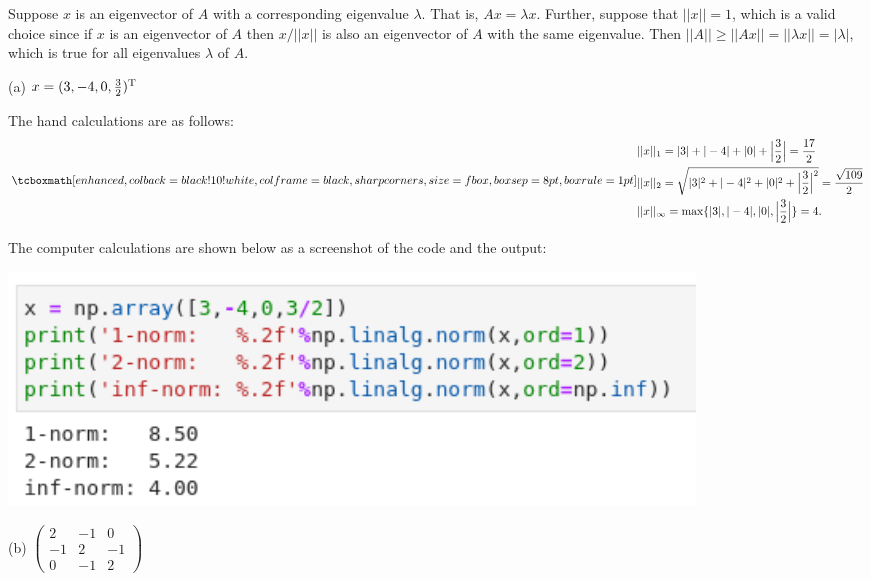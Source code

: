 
Suppose $x$ is an eigenvector of $A$ with a corresponding eigenvalue $\lambda$.
That is, $Ax = \lambda x$.
Further, suppose that $||x|| = 1$, which is a valid choice since if $x$ is an eigenvector of $A$ then $x/||x||$ is also an eigenvector of $A$ with the same eigenvalue.
Then $||A|| \geq ||Ax|| = ||\lambda x|| = |\lambda|$, which is true for all eigenvalues $\lambda$ of $A$.



(a) $x = (3,-4,0,\frac{3}{2})^{\rm T}$

The hand calculations are as follows:
\begin{eqnarray}
    \label{eq:norms-vec}
    \eqbox{
    \begin{aligned}
        &||x||_{1} = |3| + |-4| + |0| + \Big|\frac{3}{2}\Big| = \frac{17}{2} \\
        &||x||_{2} = \sqrt{|3|^2 + |-4|^2 + |0|^2 + \Big|\frac{3}{2}\Big|^2} = \frac{\sqrt{109}}{2} \\
        &||x||_{\infty} = \max \{ |3|,|-4|,|0|,\Big|\frac{3}{2}\Big| \} = 4
    .\end{aligned}
}
\end{eqnarray}

The computer calculations are shown below as a screenshot of the code and the output:

\begin{center}
\includegraphics[width=0.8\textwidth]{prob5-a.png} 
\end{center}


(b) $\begin{pmatrix}
    2 & -1 & 0 \\
    -1 & 2 & -1 \\
    0 & -1 & 2
\end{pmatrix}$

